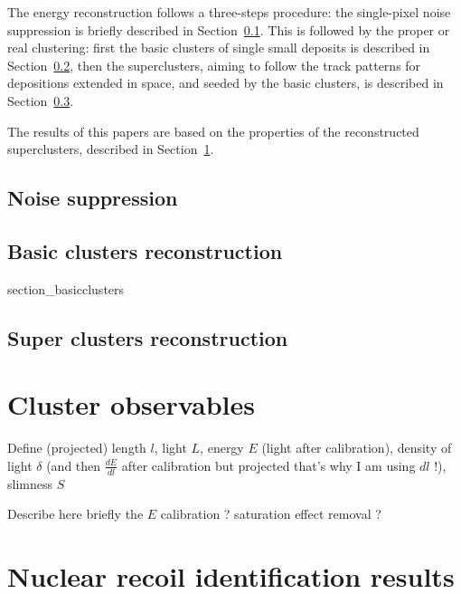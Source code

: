 \documentclass[12pt]{iopart}
\begin{document}
The energy reconstruction follows a three-steps procedure: the
single-pixel noise suppression is briefly described in
Section~\ref{sec:zerosuppression}. This is followed by the proper or
real clustering: first the basic clusters of single small deposits is
described in Section~\ref{sec:basiccl}, then the superclusters, aiming
to follow the track patterns for depositions extended in space, and
seeded by the basic clusters, is described in
Section~\ref{sec:supercl}.

The results of this papers are based on the properties of the
reconstructed superclusters, described in
Section~\ref{sec:clustershapes}.


\subsection{Noise suppression}
\label{sec:zerosuppression}



\subsection{Basic clusters reconstruction}
\label{sec:basiccl}
 {section_basicclusters}


\subsection{Super clusters reconstruction}
\label{sec:supercl}



\section{Cluster observables}
\label{sec:clustershapes}
 
 Define  (projected) length $l$, light $L$, energy $E$ (light after calibration), density of light $\delta$ (and then $\frac{dE}{dl}$ after calibration but projected that's why I am using $dl$ !), slimness $S$
 
 Describe here briefly the $E$ calibration ? saturation effect removal ? 
 
\section{Nuclear recoil identification results}
 
\end{document}
